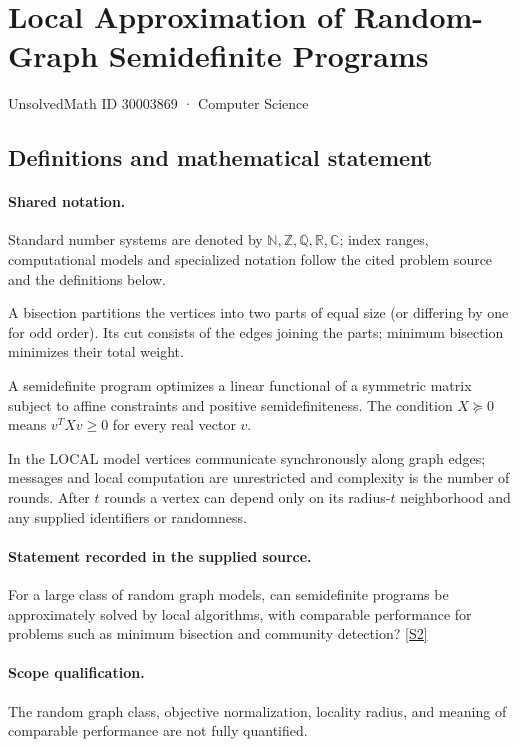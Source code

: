 \documentclass[11pt]{article}
\newcommand{\sref}[2]{\hyperlink{source:#1:#2}{[S#2]}}
\begin{document}
\setcounter{section}{30003868}
\section{Local Approximation of Random-Graph Semidefinite Programs}\label{30003869}
{\small\sffamily UnsolvedMath ID 30003869 · Computer Science}
\subsection{Definitions and mathematical statement}

\paragraph{Shared notation.}Standard number systems are denoted by $\mathbb N,\mathbb Z,\mathbb Q,\mathbb R,\mathbb C$; index ranges, computational models and specialized notation follow the cited problem source and the definitions below.


A bisection partitions the vertices into two parts of equal size (or differing by one for odd order). Its cut consists of the edges joining the parts; minimum bisection minimizes their total weight.

A semidefinite program optimizes a linear functional of a symmetric matrix subject to affine constraints and positive semidefiniteness. The condition $X\succeq0$ means $v^TXv\geq0$ for every real vector $v$.

In the LOCAL model vertices communicate synchronously along graph edges; messages and local computation are unrestricted and complexity is the number of rounds. After $t$ rounds a vertex can depend only on its radius-$t$ neighborhood and any supplied identifiers or randomness.
\paragraph{Statement recorded in the supplied source.}
For a large class of random graph models, can semidefinite programs be approximately solved by local algorithms, with comparable performance for problems such as minimum bisection and community detection? \sref{30003869}{2}
\paragraph{Scope qualification.}
The random graph class, objective normalization, locality radius, and meaning of comparable performance are not fully quantified.
\end{document}
